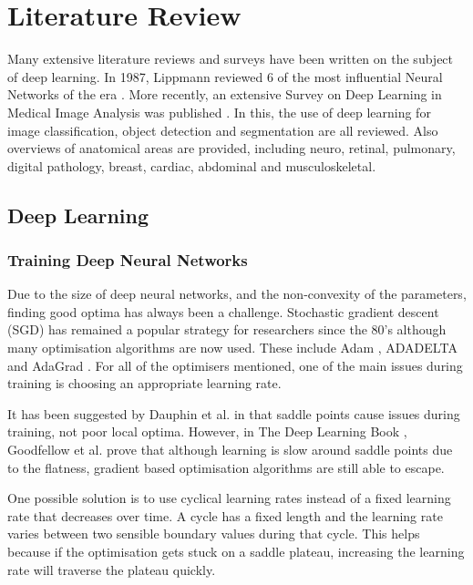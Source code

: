 
\chapter{Literature Review}\label{cha:literature}
Many extensive literature reviews and surveys have been written on the subject of deep learning.
In 1987, Lippmann reviewed 6 of the most influential Neural Networks of the era \cite{Lippmann_1987}.
More recently, an extensive Survey on Deep Learning in Medical Image Analysis was published \cite{Litjens_Kooi_Bejnordi_Setio_Ciompi_Ghafoorian_van_der_Laak_van_Ginneken_Sanchez_2017}.
In this, the use of deep learning for image classification, object detection and segmentation are all reviewed.
Also overviews of anatomical areas are provided, including neuro, retinal, pulmonary, digital pathology, breast, cardiac, abdominal and musculoskeletal.

\section{Deep Learning}\label{sec:deep_learning_lit}

\subsection{Training Deep Neural Networks}\label{subsec:training}
Due to the size of deep neural networks, and the non-convexity of the parameters, finding good optima has always been a challenge.
Stochastic gradient descent (SGD) has remained a popular strategy for researchers since the 80's although many optimisation algorithms are now used.
These include Adam \cite{Kingma_Ba_2014}, ADADELTA \cite{Zeiler_2012} and AdaGrad \cite{Duchi_Hazan_Singer_2011}.
For all of the optimisers mentioned, one of the main issues during training is choosing an appropriate learning rate.

It has been suggested by Dauphin et al. in \cite{Dauphin_de_Vries_Bengio_2015} that saddle points cause issues during training, not poor local optima.
However, in The Deep Learning Book \cite{Goodfellow-et-al-2016}, Goodfellow et al. prove that although learning is slow around saddle points due to the flatness, gradient based optimisation algorithms are still able to escape.

One possible solution is to use cyclical learning rates instead of a fixed learning rate that decreases over time.
A cycle has a fixed length and the learning rate varies between two sensible boundary values during that cycle.
This helps because if the optimisation gets stuck on a saddle plateau, increasing the learning rate will traverse the plateau quickly.

